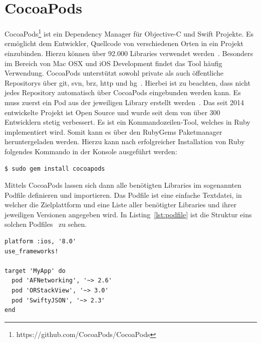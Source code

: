     \section{CocoaPods}\label{sec:cocoapods}
    CocoaPods\footnote{https://github.com/CocoaPods/CocoaPods} ist ein Dependency Manager für Objective-C und Swift Projekte.
    Es ermöglicht dem Entwickler, Quellcode von verschiedenen Orten in ein Projekt einzubinden.
    Hierzu können über 92.000 Libraries verwendet werden~\cite{cocoapods2}.
    Besonders im Bereich von Mac OSX und iOS Development findet das Tool häufig Verwendung.
    CocoaPods unterstützt sowohl private als auch öffentliche Repositorys über git, svn, brz, http und hg~\cite{cocoapods1}.
    Hierbei ist zu beachten, dass nicht jedes Repository automatisch über CocoaPods eingebunden werden kann.
    Es muss zuerst ein Pod aus der jeweiligen Library erstellt werden~\cite{cocoapods3}.
    Das seit 2014 entwickelte Projekt ist Open Source und wurde seit dem von über 300 Entwicklern stetig verbessert.
    Es ist ein Kommandozeilen-Tool, welches in Ruby implementiert wird.
    Somit kann es über den RubyGems Paketmanager heruntergeladen werden.
    Hierzu kann nach erfolgreicher Installation von Ruby folgendes Kommando in der Konsole ausgeführt werden:
    \begin{lstlisting}[language=bash,label={lst:cocoapods}]
        $ sudo gem install cocoapods
    \end{lstlisting}
    Mittels CocoaPods lassen sich dann alle benötigten Libraries im sogenannten Podfile definieren und importieren.
    Das Podfile ist eine einfache Textdatei, in welcher die Zielplattform und eine Liste aller benötigter Libraries und ihrer jeweiligen Versionen angegeben wird.
    In Listing~\ref{lst:podfile} ist die Struktur eins solchen Podfiles~\cite{cocoapods2} zu sehen.
    \begin{lstlisting}[language={},firstnumber=1,label={lst:podfile},caption={Beispielstuktur eines Podfiles},captionpos=t]
platform :ios, '8.0'
use_frameworks!

target 'MyApp' do
  pod 'AFNetworking', '~> 2.6'
  pod 'ORStackView', '~> 3.0'
  pod 'SwiftyJSON', '~> 2.3'
end
    \end{lstlisting}


